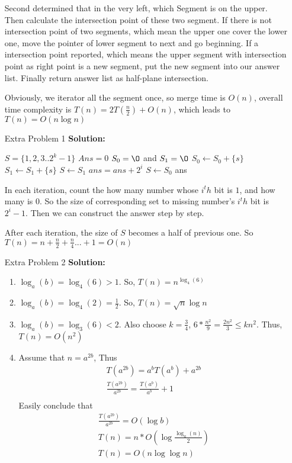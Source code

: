 \normalfont\documentclass[letterpaper,11pt]{article}
\begin{document}
\begin{enumerate}
	Second determined that in the very left, which Segment is on the upper. Then calculate the intersection point of these two segment. If there is not intersection point of two segments, which mean the upper one cover the lower one, move the pointer of lower segment to next and go beginning. If a intersection point reported, which means the upper segment with intersection point as right point is a new segment, put the new segment into our answer list.
	Finally return answer list as half-plane intersection.\par
	Obviously, we iterator all the segment once, so merge time is $O(n)$, overall time complexity is $T(n) = 2 T(\frac{n}{2}) + O(n)$, which leads to $T(n) = O(n\log n)$
\item [Extra Problem 1]\textbf{Solution:}\par
	\begin{algorithmic}
			\State $S = \{1,2,3..2^k-1\}$
			\State $Ans = 0$
				\State $S_0 = \O$ and $S_1 = \O$
						\State $S_0 \gets S_0 + \{s\}$
					\Else
						\State $S_1 \gets S_1 + \{s\}$
					\EndIf
				\EndFor
					\State $S \gets S_1$
					\State $ans = ans + 2^i$
				\Else 
					\State $S \gets S_0$
				\EndIf 
			\EndFor
			\State \Return ans
		\EndFunction
	\end{algorithmic}
	In each iteration, count the how many number whose $i^th$ bit is $1$, and how many is $0$. So the size of corresponding set to missing number's $i^th$ bit is $2^i - 1$. Then we can construct the answer step by step.\par
	After each iteration, the size of $S$ becomes a half of previous one. So $T(n) = n + \frac{n}{2} + \frac{n}{4}... + 1 = O(n)$ 
\item [Extra Problem 2]\textbf{Solution:}\par
	\begin{enumerate}
	\item $\log_a(b) = \log_4(6) > 1$. So, $T(n) = n^{\log_4(6)}$
	\item $\log_a(b) = \log_4(2) = \frac{1}{2}$. So, $T(n) = \sqrt{n}\log n$
	\item $\log_a(b) = \log_3(6) < 2$. Also choose $k = \frac{3}{4}$, $6*\frac{n^2}{9} = \frac{2n^2}{3} \le kn^2$. Thus, $T(n) = O(n^2)$
	\item Assume that $n = a ^{2b}$, Thus	
		\begin{gather*}
			T(a^{2b}) = a^{b}T(a^b) + a^{2b} \\ 
			\frac{T(a^{2b})}{a^{2b}} = \frac{T(a^{b})}{a^{b}} + 1\\
		\end{gather*}
		Easily conclude that
		\begin{gather*}
			\frac{T(a^{2b})}{a^{2b}} = O(\log {b})\\
			T(n) = n * O(\log {\frac{\log_a(n)}{2}})\\
			T(n) = O(n\log{\log n})
		\end{gather*}
	\end{enumerate}
\end{enumerate}
\end{document}
